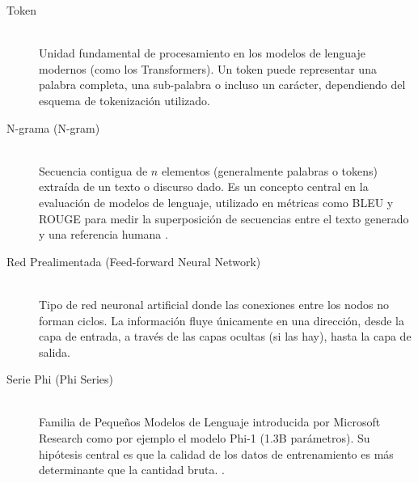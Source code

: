 \documentclass[11pt, a4paper]{article}
\begin{document}
\begin{description}

    \item[\hypertarget{glo:token}{Token}] \hfill \\
    Unidad fundamental de procesamiento en los modelos de lenguaje modernos (como los Transformers). Un token puede representar una palabra completa, una sub-palabra o incluso un carácter,
    dependiendo del esquema de tokenización utilizado.

    \item[\hypertarget{glo:n-gram}{N-grama (N-gram)}] \hfill \\
    Secuencia contigua de $n$ elementos (generalmente palabras o tokens) extraída de un texto o discurso dado. Es un concepto central en la evaluación de modelos de lenguaje, utilizado en
    métricas como BLEU y ROUGE para medir la superposición de secuencias entre el texto generado y una referencia humana \cite{papineni_bleu_2001, lin_rouge_nodate}.

    \item[\hypertarget{glo:feedforward}{Red Prealimentada (Feed-forward Neural Network)}] \hfill \\
    Tipo de red neuronal artificial donde las conexiones entre los nodos no forman ciclos. La información fluye únicamente en una dirección, desde la capa de entrada, a través de las capas
    ocultas (si las hay), hasta la capa de salida.

    \item[\hypertarget{glo:phi}{Serie Phi (Phi Series)}] \hfill \\
    Familia de Pequeños Modelos de Lenguaje introducida por Microsoft Research como por ejemplo el modelo Phi-1 (1.3B parámetros). Su hipótesis central es que la calidad de los datos de
    entrenamiento es más determinante que la cantidad bruta.
    \cite{gunasekar_textbooks_2023}.

\end{description}

\printbibliography
\end{document}
